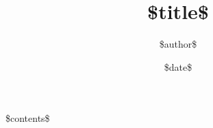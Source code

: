 \documentclass{article}
\begin{document}
\title{\$title\$} 
\author{\$author\$}
\date{\$date\$}

\maketitle

\tableofcontents

\$contents\$
\end{document}
